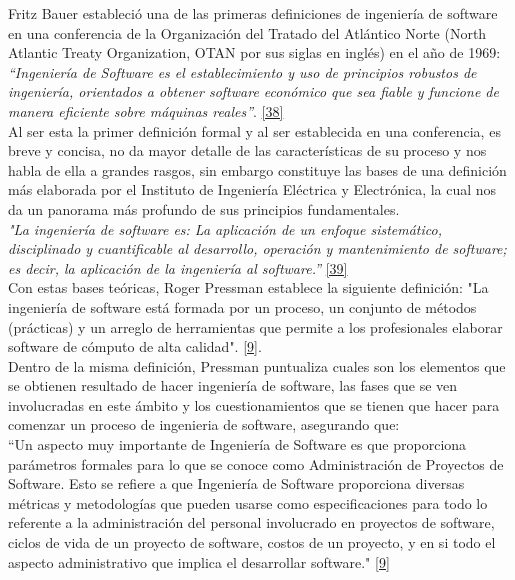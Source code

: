 Fritz Bauer estableció una de las primeras definiciones de ingeniería de software en una conferencia de la Organización del Tratado del Atlántico Norte (North Atlantic Treaty Organization, OTAN por sus siglas en inglés) en el año de 1969: \textit {“Ingeniería de Software es el establecimiento y uso de principios robustos de ingeniería, orientados a obtener software económico que sea fiable y funcione de manera eficiente sobre máquinas reales”}. \hyperlink{b38}{[38]}\\
	
Al ser esta la primer definición formal y al ser establecida en una conferencia, es breve y concisa, no da mayor detalle de las características de su proceso y nos habla de ella a grandes rasgos, sin embargo constituye las bases de una definición más elaborada por el Instituto de Ingeniería Eléctrica y Electrónica, la cual nos da un panorama más profundo de sus principios fundamentales. \\

\textit {"La ingeniería de software es: La aplicación de un enfoque sistemático, disciplinado y cuantificable al desarrollo, operación y mantenimiento de software; es decir, la aplicación de la ingeniería al software.”}  \hyperlink{b39}{[39]}\\

Con estas bases teóricas, Roger Pressman establece la siguiente definición: "La ingeniería de software está formada por un proceso, un conjunto de métodos (prácticas) y un arreglo de herramientas que permite a los profesionales elaborar software de cómputo de alta calidad".  \hyperlink{b09}{[9]}. \\

Dentro de la misma definición, Pressman puntualiza cuales son los elementos que se obtienen resultado de hacer ingeniería de software, las fases que se ven involucradas en este ámbito y los cuestionamientos que se tienen que hacer para comenzar un proceso de ingenieria de software, asegurando que:\\

``Un aspecto muy importante de Ingeniería de Software es que proporciona parámetros formales para lo que se conoce como Administración de Proyectos de Software. Esto se refiere a que Ingeniería de Software proporciona diversas métricas y metodologías que pueden usarse como especificaciones para todo lo referente a la administración del personal involucrado en proyectos de software, ciclos de vida de un proyecto de software, costos de un proyecto, y en si todo el aspecto administrativo que implica el desarrollar software."  \hyperlink{b09}{[9]} \\

